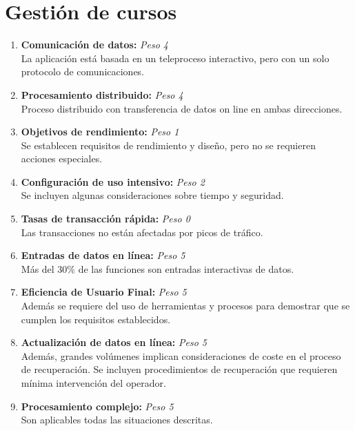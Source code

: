 \documentclass[11pt,a4paper,spanish,twoside]{book}
\begin{document}
\section{Gestión de cursos}
\begin{enumerate}[{\bf 1.}]

\item {\bf Comunicación de datos:} \emph{Peso 4} \\ La aplicación está basada en
  un teleproceso interactivo, pero con un solo protocolo de comunicaciones.

\item {\bf Procesamiento distribuido:} \emph{Peso 4} \\ Proceso distribuido
  con transferencia de datos on line en ambas direcciones. 

\item {\bf Objetivos de rendimiento:} \emph{Peso 1} \\ Se establecen requisitos
  de rendimiento y diseño, pero no se requieren acciones especiales.

\item {\bf Configuración de uso intensivo:} \emph{Peso 2} \\ Se incluyen algunas
  consideraciones sobre tiempo y seguridad. 

\item {\bf Tasas de transacción rápida:} \emph{Peso 0} \\ Las transacciones no
  están afectadas por picos de tráfico. 

\item {\bf Entradas de datos en línea:} \emph{Peso 5} \\ Más del 30\% de las
  funciones son entradas interactivas de datos. 

\item {\bf Eficiencia de Usuario Final:} \emph{Peso 5} \\ Además se requiere del
  uso de herramientas y procesos para demostrar que se cumplen los requisitos
  establecidos.

\item {\bf Actualización de datos en línea:} \emph{Peso 5} \\ Además, grandes
  volúmenes implican consideraciones de coste en el proceso de
  recuperación. Se incluyen procedimientos de recuperación que requieren
  mínima intervención del operador. 

\item {\bf Procesamiento complejo:} \emph{Peso 5} \\ Son aplicables todas las
  situaciones descritas.
 

\end{enumerate}
\end{document}
